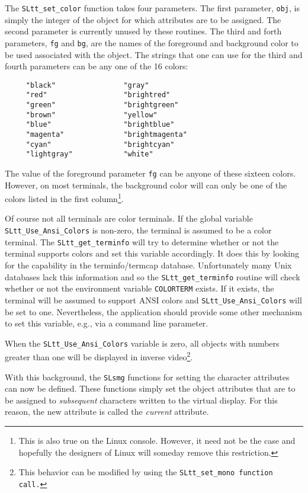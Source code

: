   The \verb|SLtt_set_color| function takes four parameters.  The first
  parameter, \verb|obj|, is simply the integer of the object for which
  attributes are to be assigned.  The second parameter is currently unused
  by these routines.  The third and forth parameters, \verb|fg| and \verb|bg|,
  are the names of the foreground and background color to be used associated
  with the object.  The strings that one can use for the third and fourth
  parameters can be any one of the 16 colors:
\begin{verbatim}
     "black"                "gray"
     "red"                  "brightred"
     "green"                "brightgreen"
     "brown"                "yellow"
     "blue"                 "brightblue"
     "magenta"              "brightmagenta"
     "cyan"                 "brightcyan"
     "lightgray"            "white"
\end{verbatim} 
  The value of the foreground parameter \verb|fg| can be anyone of these
  sixteen colors.   However, on most terminals, the background color will
  can only be one of the colors listed in the first column\footnote{This is
  also true on the Linux console.  However, it need not be the case and
  hopefully the designers of Linux will someday remove this restriction.}.

  Of course not all terminals are color terminals.  If the \slang{} global
  variable \verb|SLtt_Use_Ansi_Colors| is non-zero, the terminal is
  assumed to be a color terminal.  The \verb|SLtt_get_terminfo| will
  try to determine whether or not the terminal supports colors and set
  this variable accordingly.  It does this by looking for the
  capability in the terminfo/termcap database.  Unfortunately many Unix
  databases lack this information and so the \verb|SLtt_get_terminfo|
  routine will check whether or not the environment variable
  \verb|COLORTERM| exists.  If it exists, the terminal will be assumed
  to support ANSI colors and \verb|SLtt_Use_Ansi_Colors| will be set to one.
  Nevertheless, the application should provide some other mechanism to set
  this variable, e.g., via a command line parameter.

  When the \verb|SLtt_Use_Ansi_Colors| variable is zero, all objects
  with numbers greater than one will be displayed in inverse
  video\footnote{This behavior can be modified by using the
  \tt{SLtt\_set\_mono} function call.}.

  With this background, the \verb|SLsmg| functions for setting the character
  attributes can now be defined.  These functions simply set the object
  attributes that are to be assigned to {\em subsequent} characters written
  to the virtual display.  For this reason, the new attribute is called the
  {\em current} attribute.

